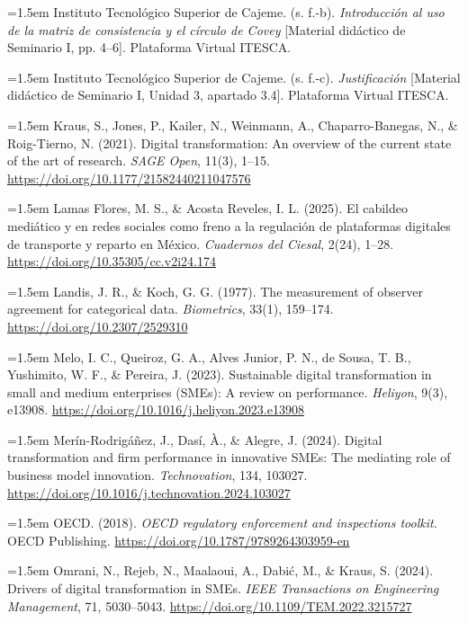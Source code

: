 {\hangindent=1.5em Instituto Tecnológico Superior de Cajeme. (s. f.-b). \textit{Introducción al uso de la matriz de consistencia y el círculo de Covey} [Material didáctico de Seminario I, pp. 4--6]. Plataforma Virtual ITESCA.

\hangindent=1.5em Instituto Tecnológico Superior de Cajeme. (s. f.-c). \textit{Justificación} [Material didáctico de Seminario I, Unidad 3, apartado 3.4]. Plataforma Virtual ITESCA.

\hangindent=1.5em Kraus, S., Jones, P., Kailer, N., Weinmann, A., Chaparro-Banegas, N., \& Roig-Tierno, N. (2021). Digital transformation: An overview of the current state of the art of research. \textit{SAGE Open}, 11(3), 1--15. \url{https://doi.org/10.1177/21582440211047576}

\hangindent=1.5em Lamas Flores, M. S., \& Acosta Reveles, I. L. (2025). El cabildeo mediático y en redes sociales como freno a la regulación de plataformas digitales de transporte y reparto en México. \textit{Cuadernos del Ciesal}, 2(24), 1--28. \url{https://doi.org/10.35305/cc.v2i24.174}

\hangindent=1.5em Landis, J. R., \& Koch, G. G. (1977). The measurement of observer agreement for categorical data. \textit{Biometrics}, 33(1), 159--174. \url{https://doi.org/10.2307/2529310}

\hangindent=1.5em Melo, I. C., Queiroz, G. A., Alves Junior, P. N., de Sousa, T. B., Yushimito, W. F., \& Pereira, J. (2023). Sustainable digital transformation in small and medium enterprises (SMEs): A review on performance. \textit{Heliyon}, 9(3), e13908. \url{https://doi.org/10.1016/j.heliyon.2023.e13908}

\hangindent=1.5em Merín-Rodrigáñez, J., Dasí, À., \& Alegre, J. (2024). Digital transformation and firm performance in innovative SMEs: The mediating role of business model innovation. \textit{Technovation}, 134, 103027. \url{https://doi.org/10.1016/j.technovation.2024.103027}

\hangindent=1.5em OECD. (2018). \textit{OECD regulatory enforcement and inspections toolkit}. OECD Publishing. \url{https://doi.org/10.1787/9789264303959-en}

\hangindent=1.5em Omrani, N., Rejeb, N., Maalaoui, A., Dabić, M., \& Kraus, S. (2024). Drivers of digital transformation in SMEs. \textit{IEEE Transactions on Engineering Management}, 71, 5030--5043. \url{https://doi.org/10.1109/TEM.2022.3215727}

}
